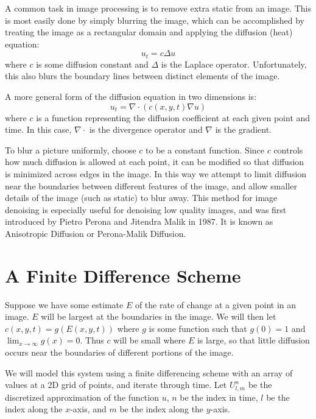 \label{lab:AnisotropicDiffusion}


A common task in image processing is to remove extra static from an image.
This is most easily done by simply blurring the image, which can be accomplished by  treating the image as a rectangular domain and applying the diffusion (heat) equation:
\[u_t = c \Delta u\]
where $c$ is some diffusion constant and $\Delta$ is the Laplace operator.
Unfortunately, this also blurs the boundary lines between distinct elements of the image.

A more general form of the diffusion equation in two dimensions is:
\[u_t = \nabla\cdot \left( c(x,y,t) \nabla u \right)\]
where $c$ is a function representing the diffusion coefficient at each given point and time.
In this case, $\nabla \cdot$ is the divergence operator and $\nabla$ is the gradient. 

To blur a picture uniformly, choose $c$ to be a constant function.  
Since $c$ controls how much diffusion is allowed at each point, it can be modified so that diffusion is minimized across edges in the image.
In this way we attempt to limit diffusion near the boundaries between different features of the image, and allow smaller details of the image (such as static) to blur away. 
This method for image denoising is especially useful for denoising low quality images, and was first introduced by Pietro Perona and Jitendra Malik in 1987.
It is known as Anisotropic Diffusion or Perona-Malik Diffusion.

\section*{A Finite Difference Scheme}
Suppose we have some estimate $E$ of the rate of change at a given point in an image.
$E$ will be largest at the boundaries in the image.
We will then let $c(x,y,t) = g(E(x,y,t))$ where $g$ is some function such that $g(0)=1$ and $\displaystyle{\lim_{x \to \infty} g(x) = 0}$.
Thus $c$ will be small where $E$ is large, so that little diffusion occurs near the boundaries of different portions of the image.

We will model this system using a finite differencing scheme with an array of values at a 2D grid of points, and iterate through time.
Let $U_{l,m}^n$ be the discretized approximation of the function $u$, $n$ be the index in time, $l$ be the index along the $x$-axis, and $m$ be the index along the $y$-axis.

